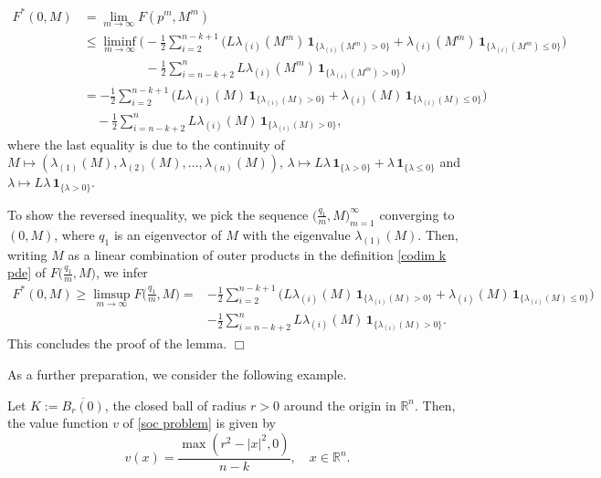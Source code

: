 \documentclass[11pt]{amsart}
\numberwithin{equation}{section}
\newcommand{\ep}{\hfill $\Box$}
\begin{document}
\begin{equation}
\begin{split}
F^*(0,M)&=\lim_{m\to\infty} F(p^m,M^m) \\
&\le \liminf_{m\to\infty}
\bigg(\!-\frac{1}{2}\sum_{i=2}^{n-k+1} \big(L\lambda_{(i)}(M^m)\,\mathbf{1}_{\{\lambda_{(i)}(M^m)>0\}}
+\lambda_{(i)}(M^m)\,\mathbf{1}_{\{\lambda_{(i)}(M^m)\le 0\}}\big) \\
&\qquad\qquad\;\;\; -\frac{1}{2}\sum_{i=n-k+2}^n L\lambda_{(i)}(M^m)\,\mathbf{1}_{\{\lambda_{(i)}(M^m)>0\}}\bigg) \\
&=-\frac{1}{2}\sum_{i=2}^{n-k+1} \big(L\lambda_{(i)}(M)\,\mathbf{1}_{\{\lambda_{(i)}(M)>0\}}
+\lambda_{(i)}(M)\,\mathbf{1}_{\{\lambda_{(i)}(M)\le 0\}}\big) \\
&\quad -\frac{1}{2}\sum_{i=n-k+2}^n L\lambda_{(i)}(M)\,\mathbf{1}_{\{\lambda_{(i)}(M)>0\}},
\end{split}
\end{equation} 
where the last equality is due to the continuity of $M\mapsto(\lambda_{(1)}(M),\lambda_{(2)}(M),\ldots,\lambda_{(n)}(M))$, $\lambda\mapsto L\lambda\,\mathbf{1}_{\{\lambda>0\}}+\lambda\,\mathbf{1}_{\{\lambda\le0\}}$ and $\lambda\mapsto L\lambda\,\mathbf{1}_{\{\lambda>0\}}$.

\medskip

To show the reversed inequality, we pick the sequence $\big(\frac{q_1}{m}, M\big)_{m=1}^\infty$ converging to $(0,M)$, where $q_1$ is an eigenvector of $M$ with the eigenvalue $\lambda_{(1)}(M)$. Then, writing $M$ as a linear combination of outer products in the definition \eqref{codim k pde} of $F\big(\frac{q_1}{m}, M\big)$, we infer 
\[
\begin{split}
F^*(0, M) \ge \limsup_{m\to\infty} F\Big(\frac{q_1}{m}, M\Big) 
= &-\frac{1}{2}\sum_{i=2}^{n-k+1} \big(L\lambda_{(i)}(M)\,\mathbf{1}_{\{\lambda_{(i)}(M)>0\}}
+\lambda_{(i)}(M)\,\mathbf{1}_{\{\lambda_{(i)}(M)\le 0\}}\big) \\ 
&-\frac{1}{2}\sum_{i=n-k+2}^n L\lambda_{(i)}(M)\,\mathbf{1}_{\{\lambda_{(i)}(M)>0\}}.
\end{split}
\]
This concludes the proof of the lemma. \ep

\medskip

As a further preparation, we consider the following example.

\begin{exm} \label{ex: ball}
Let $K:=\overline{B_r(0)}$, the closed ball of radius $r>0$ around the origin in $\mathbb{R}^n$. Then, the value function $v$ of \eqref{soc problem} is given by
\begin{equation}\label{eq: radial v}
v(x) = \frac{\max(r^2 - |x|^2,0)}{n-k},\quad x\in \mathbb{R}^n. 
\end{equation}
\end{exm}
\end{document}

